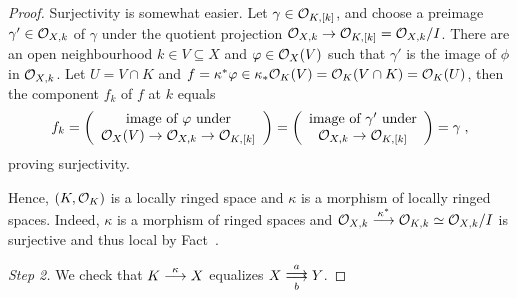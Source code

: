 \documentclass[a4paper,parskip=half,numbers=enddot, DIV=12]{scrreprt}
\begin{document}
\begin{proof}
	Surjectivity is somewhat easier. Let $\gamma\in\mathcal{O}_{K,[k]}$, and choose a preimage $\gamma'\in\mathcal{O}_{X,k}$ of $\gamma$ under the quotient projection $\Oo_{X,k}\morphism\Oo_{K,[k]}=\Oo_{X,k}/I$. There are an open neighbourhood $k\in V\subseteq X$ and $\varphi\in\mathcal{O}_X(V)$ such that $\gamma'$ is the image of $\phi$ in $\mathcal{O}_{X,k}$. Let $U=V\cap K$ and $f=\kappa^*\varphi\in\kappa_*\mathcal{O}_K(V)=\mathcal{O}_K(V\cap K)=\mathcal{O}_K(U)$, then the component $f_k$ of $f$ at $k$ equals
	\begin{align*}
		f_k=\left(
		\begin{array}{c}
			\text{image of }\phi\text{ under}\\
			\Oo_X(V)\morphism\Oo_{X,k}\morphism\Oo_{K,[k]}
		\end{array}\right)=\left(
		\begin{array}{c}
			\text{image of }\gamma'\text{ under}\\
			\Oo_{X,k}\morphism\Oo_{K,[k]}
		\end{array}\right)=\gamma\;,
	\end{align*}
	proving surjectivity.
	
	Hence, $(K,\mathcal{O}_K)$ is a locally ringed space and $\kappa$ is a morphism of locally ringed spaces. Indeed, $\kappa$ is a morphism of ringed spaces and $\Oo_{X,k}\morphism[\kappa^*]\Oo_{K,k}\simeq\Oo_{X,k}/I$ is surjective and thus local by Fact~.
	
	\emph{Step 2.} We check that $K\morphism[\kappa]X$ equalizes $X\doublemorphism[a][\smash{b}]Y$.
	

\end{proof}
\end{document}
